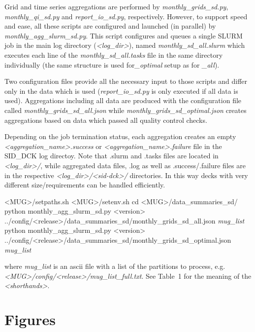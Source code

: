 \documentclass[letterpaper,10pt,english]{sphinxmanual}
\begin{document}
Grid and time series aggregations are performed by \textit{monthly\_grids\_sd.py}, \textit{monthly\_qi\_sd.py} and  \textit{report\_io\_sd.py}, respectively. 
However, to support speed and ease, all these scripts are configured and launched (in parallel) by \textit{monthly\_agg\_slurm\_sd.py}. 
This script configures and queues a single SLURM job in the main log directory (\textit{<log\_dir>}), named \textit{monthly\_sd\_all.slurm} which executes each line of the \textit{monthly\_sd\_all.tasks} file in the same directory individually (the same structure is used for\textit{\_optimal} setup as for \textit{\_all}).

Two configuration files provide all the necessary input to those scripts and differ only in the data which is used (\textit{report\_io\_sd.py} is only executed if all data is used).
Aggregations including all data are produced with the configuration file called \textit{monthly\_grids\_sd\_all.json} while \textit{monthly\_grids\_sd\_optimal.json} creates aggregations based on data which passed all quality control checks.

Depending on the job termination status, each aggregation creates an empty \textit{<aggregation\_name>.success} or \textit{<aggregation\_name>.failure} file in the SID\_DCK log directoy.
Note that .slurm and .tasks files are located in \textit{<log\_dir>/}, while aggregated data files, .log as well as .success/.failure files are in the respective \textit{<log\_dir>/<sid-dck>/} directories. 
In this way decks with very different size/requirements can be handled efficiently.

\begin{sphinxVerbatim}[commandchars=\\\{\}]
 <MUG>/setpaths.sh
 <MUG>/setenv.sh
cd <MUG>/data\_summaries\_sd/
python monthly\_agg\_slurm\_sd.py <version> ../config/<release>/data\_summaries\_sd/monthly\_grids\_sd\_all.json \textit{mug\_list}
python monthly\_agg\_slurm\_sd.py <version> ../config/<release>/data\_summaries\_sd/monthly\_grids\_sd\_optimal.json \textit{mug\_list}
\end{sphinxVerbatim}

where \textit{mug\_list} is an ascii file with a list of the  partitions to process, e.g. \textit{<MUG>/config/<release>/mug\_list\_full.txt}.
See Table~1 for the meaning of the \textit{<shorthands>}.

\section{Figures}
\label{\detokenize{index:id5}}
\end{document}
